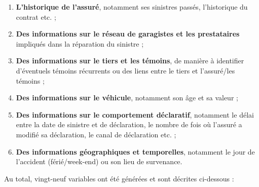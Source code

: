 \begin{enumerate}
    \item \textbf{L'historique de l'assuré}, notamment ses sinistres passés, l'historique du contrat etc. ;
    \item \textbf{Des informations sur le réseau de garagistes et les prestataires} impliqués dans la réparation du sinistre ;
    \item \textbf{Des informations sur le tiers et les témoins}, de manière à identifier d'éventuels témoins récurrents ou des liens entre le tiers et l'assuré/les témoins ;
    \item \textbf{Des informations sur le véhicule}, notamment son âge et sa valeur ;
    \item \textbf{Des informations sur le comportement déclaratif}, notamment le délai entre la date de sinistre et de déclaration, le nombre de fois où l'assuré a modifié sa déclaration, le canal de déclaration etc. ;
    \item \textbf{Des informations géographiques et temporelles}, notamment le jour de l'accident (férié/week-end) ou son lieu de survenance.
\end{enumerate}

Au total, vingt-neuf variables ont été générées et sont décrites ci-dessous :

